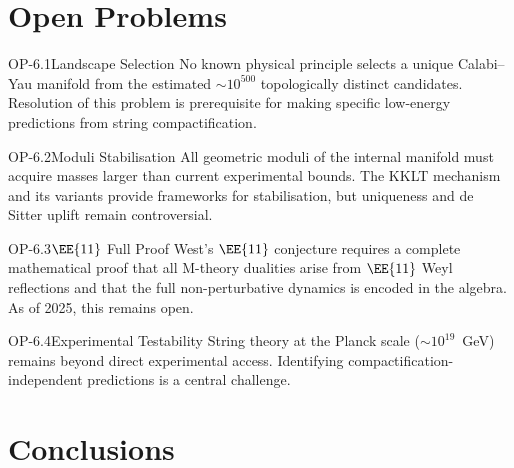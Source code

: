 \section{Open Problems}
\label{sec:string_open}

\begin{openproblem}{OP-6.1}{Landscape Selection}
No known physical principle selects a unique Calabi--Yau manifold from the
estimated $\sim 10^{500}$ topologically distinct candidates.  Resolution of
this problem is prerequisite for making specific low-energy predictions from
string compactification.
\end{openproblem}

\begin{openproblem}{OP-6.2}{Moduli Stabilisation}
All geometric moduli of the internal manifold must acquire masses larger
than current experimental bounds.  The KKLT mechanism and its variants
provide frameworks for stabilisation, but uniqueness and de Sitter uplift
remain controversial.
\end{openproblem}

\begin{openproblem}{OP-6.3}{$\EE{11}$ Full Proof}
West's $\EE{11}$ conjecture requires a complete mathematical proof
that all M-theory dualities arise from $\EE{11}$ Weyl reflections and
that the full non-perturbative dynamics is encoded in the algebra.  As of
2025, this remains open.
\end{openproblem}

\begin{openproblem}{OP-6.4}{Experimental Testability}
String theory at the Planck scale ($\sim 10^{19}$~GeV) remains beyond
direct experimental access.  Identifying compactification-independent
predictions is a central challenge.
\end{openproblem}

\section{Conclusions}
\label{sec:string_conclusions}


